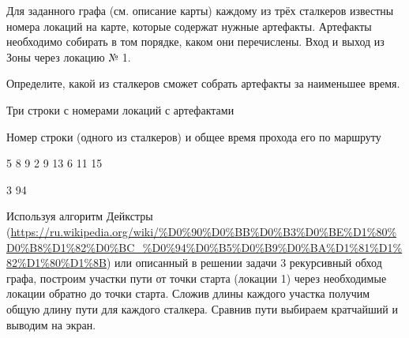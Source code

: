 
Для заданного графа (см. описание карты) каждому из трёх сталкеров известны номера локаций на карте, которые содержат нужные артефакты. Артефакты необходимо собирать в том порядке, каком они перечислены. Вход и выход из Зоны через локацию № 1.

Определите, какой из сталкеров сможет собрать артефакты за наименьшее время.


Три строки с номерами локаций с артефактами

\outputfmtSection

Номер строки (одного из сталкеров) и общее время прохода его по маршруту

\begin{myverbbox}[\small]{\vinput}
    5 8 9
    2 9 13
    6 11 15
\end{myverbbox}
\begin{myverbbox}[\small]{\voutput}
    3 94
\end{myverbbox}

\explanationSection

Используя алгоритм Дейкстры (\url{https://ru.wikipedia.org/wiki/%D0%90%D0%BB%D0%B3%D0%BE%D1%80%D0%B8%D1%82%D0%BC_%D0%94%D0%B5%D0%B9%D0%BA%D1%81%D1%82%D1%80%D1%8B}) или описанный в решении задачи 3 рекурсивный обход графа, построим участки пути от точки старта (локации 1) через необходимые локации обратно до точки старта. Сложив длины каждого участка получим общую длину пути для каждого сталкера. Сравнив пути выбираем кратчайший и выводим на экран.